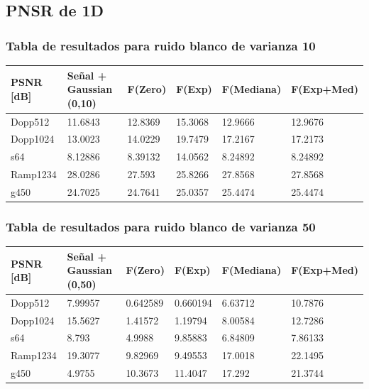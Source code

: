 \newpage
\subsection{PNSR de 1D}

\subsubsection{Tabla de resultados para ruido blanco de varianza 10}

\begin{table}[H]
        \begin{tabular}{|l|lllll|}
                \hline
                \textbf{PSNR [dB]} & Se\~nal + Gaussian (0,10) & F(Zero) & F(Exp) & F(Mediana) & F(Exp+Med) \\ \hline
                    Dopp512 & 11.6843 							& 12.8369 & 15.3068 & 12.9666  &  12.9676 \\
                    Dopp1024 & 13.0023 							& 14.0229 & 19.7479 & 17.2167  &  17.2173 \\
                    s64 & 8.12886 								& 8.39132 & 14.0562 & 8.24892  &   8.24892\\
                    Ramp1234 & 28.0286 							& 27.593 & 25.8266 & 27.8568  &  27.8568 \\
                    g450 & 24.7025 								& 24.7641 & 25.0357 & 25.4474  &   25.4474 \\ \hline
                    \end{tabular}
                \end{table}


\subsubsection{Tabla de resultados para ruido blanco de varianza 50}

\begin{table}[H]
        \begin{tabular}{|l|lllll|}
                \hline
                \textbf{PSNR [dB]} & Se\~nal + Gaussian (0,50) & F(Zero) & F(Exp) & F(Mediana) & F(Exp+Med) \\ \hline
                    Dopp512 		& 7.99957				 & 0.642589 & 0.660194 & 6.63712 & 10.7876\\
                    Dopp1024 & 15.5627 							& 1.41572 & 1.19794 & 8.00584 &  12.7286   \\
                    s64 & 8.793 								& 4.9988 & 9.85883 &  6.84809  & 7.86133\\
                    Ramp1234	& 19.3077 						& 9.82969 & 9.49553 & 17.0018 & 22.1495 \\
                    g450 	& 4.9755 							& 10.3673 & 11.4047 & 17.292   &  21.3744\\ \hline
                    \end{tabular}
                \end{table}



